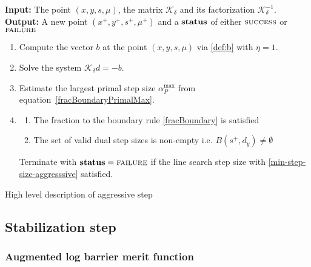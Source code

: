 \documentclass{article}
\begin{document}
\begin{algorithm}[H]
\textbf{Input:} The point $(x,y,s, \mu)$, the matrix $\mathcal{K}_{\delta}$ and its factorization $\mathcal{K}_{\delta}^{-1}$. \\
\textbf{Output:} A new point $(x^{+}, y^{+}, s^{+}, \mu^{+})$ and a $\textbf{status}$ of either $\textsc{success}$ or $\textsc{failure}$
\begin{enumerate}[label*=A.{\arabic*}]
\item Compute the vector $b$ at the point $(x,y,s, \mu)$ via \eqref{def:b} with $\eta = 1$.
\item Solve the system $\mathcal{K}_{\delta} d = -b$.
\item Estimate the largest primal step size $\alpha^{\max}_{P}$ from equation~\eqref{fracBoundaryPrimalMax}.
\item \label{agg:back-track} \backtrackBlurb
\begin{enumerate}[label=({\roman*})] 
\item The fraction to the boundary rule \eqref{fracBoundary} is satisfied
\item The set of valid dual step sizes is non-empty i.e. $B( s^{+}, d_{y} ) \neq \emptyset$ 
\end{enumerate}
Terminate with $\textbf{status} = \textsc{failure}$ if the line search step size with \eqref{min-step-size-aggresssive} satisfied.
\end{enumerate}
\caption{High level description of aggressive step}\label{alg:aggressive}
\end{algorithm}


\subsection{Stabilization step}

\subsubsection{Augmented log barrier merit function}\label{sec:augmented-log-barrier}
\end{document}
